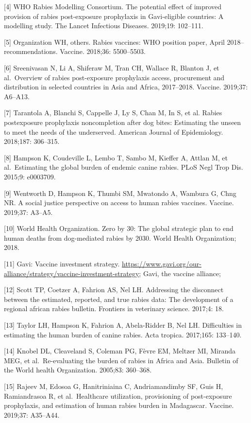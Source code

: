 \documentclass[
]{book}
\begin{document}
{[}4{]} WHO Rabies Modelling Consortium. The potential effect of improved
provision of rabies post-exposure prophylaxis in Gavi-eligible
countries: A modelling study. The Lancet Infectious Diseases. 2019;19:
102--111.

{[}5{]} Organization WH, others. Rabies vaccines: WHO position paper, April
2018--recommendations. Vaccine. 2018;36: 5500--5503.

{[}6{]} Sreenivasan N, Li A, Shiferaw M, Tran CH, Wallace R, Blanton J, et
al.~Overview of rabies post-exposure prophylaxis access, procurement and
distribution in selected countries in Asia and Africa, 2017--2018.
Vaccine. 2019;37: A6--A13.

{[}7{]} Tarantola A, Blanchi S, Cappelle J, Ly S, Chan M, In S, et al.
Rabies postexposure prophylaxis noncompletion after dog bites:
Estimating the unseen to meet the needs of the underserved. American
Journal of Epidemiology. 2018;187: 306--315.

{[}8{]} Hampson K, Coudeville L, Lembo T, Sambo M, Kieffer A, Attlan M, et
al.~Estimating the global burden of endemic canine rabies. PLoS Negl
Trop Dis. 2015;9: e0003709.

{[}9{]} Wentworth D, Hampson K, Thumbi SM, Mwatondo A, Wambura G, Chng NR. A
social justice perspective on access to human rabies vaccines. Vaccine.
2019;37: A3--A5.

{[}10{]} World Health Organization. Zero by 30: The global strategic plan to
end human deaths from dog-mediated rabies by 2030. World Health
Organization; 2018.

{[}11{]} Gavi: Vaccine investment strategy.
\url{https://www.gavi.org/our-alliance/strategy/vaccine-investment-strategy};
Gavi, the vaccine alliance;

{[}12{]} Scott TP, Coetzer A, Fahrion AS, Nel LH. Addressing the disconnect
between the estimated, reported, and true rabies data: The development
of a regional african rabies bulletin. Frontiers in veterinary science.
2017;4: 18.

{[}13{]} Taylor LH, Hampson K, Fahrion A, Abela-Ridder B, Nel LH.
Difficulties in estimating the human burden of canine rabies. Acta
tropica. 2017;165: 133--140.

{[}14{]} Knobel DL, Cleaveland S, Coleman PG, Fèvre EM, Meltzer MI, Miranda
MEG, et al.~Re-evaluating the burden of rabies in Africa and Asia.
Bulletin of the World health Organization. 2005;83: 360--368.

{[}15{]} Rajeev M, Edosoa G, Hanitriniaina C, Andriamandimby SF, Guis H,
Ramiandrasoa R, et al.~Healthcare utilization, provisioning of
post-exposure prophylaxis, and estimation of human rabies burden in
Madagascar. Vaccine. 2019;37: A35--A44.
\end{document}
